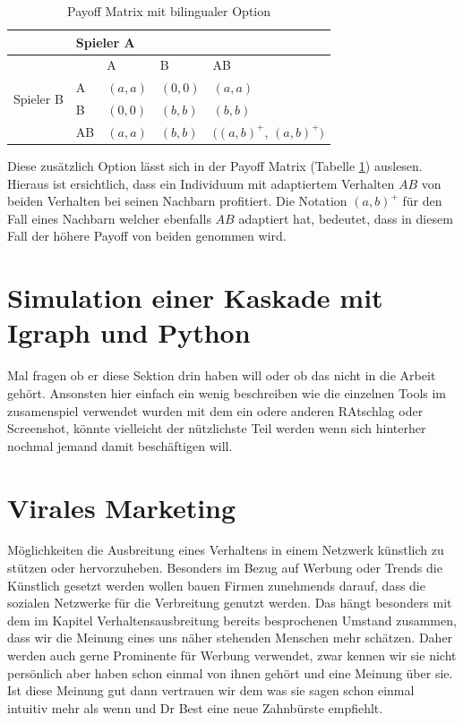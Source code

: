 \documentclass[12pt]{article}
\begin{document}
\begin{table}[h]
\centering
\caption{Payoff Matrix mit bilingualer Option}
\label{table_payoffBi}
\begin{tabular}{|l|l|l|l|l|}
\hline
                           & \multicolumn{4}{l|}{Spieler A}                                          \\ \hline
\multirow{4}{*}{Spieler B} &    & A     & B     & AB                                                 \\ \cline{2-5} 
                           & A  & $(a,a)$ & $(0,0)$ & $(a,a)$                                              \\ \cline{2-5} 
                           & B  & $(0,0)$ & $(b,b)$ & $(b,b)$                                              \\ \cline{2-5} 
                           & AB & $(a,a)$ & $(b,b)$ & $((a,b)^+$, $(a,b)^+)$ \\ \hline
\end{tabular}
\end{table}

Diese zusätzlich Option lässt sich in der Payoff Matrix (Tabelle \ref{table_payoffBi}) auslesen. Hieraus ist ersichtlich, dass ein Individuum mit adaptiertem Verhalten $AB$ von beiden Verhalten bei seinen Nachbarn profitiert. Die Notation $(a,b)^+$ für den Fall eines Nachbarn welcher ebenfalls $AB$ adaptiert hat, bedeutet, dass in diesem Fall der höhere Payoff von beiden genommen wird.


\section{Simulation einer Kaskade mit Igraph und Python}
Mal fragen ob er diese Sektion drin haben will oder ob das nicht in die Arbeit gehört. Ansonsten hier einfach ein wenig beschreiben wie die einzelnen Tools im zusamenspiel verwendet wurden mit dem ein odere anderen RAtschlag oder Screenshot, könnte vielleicht der nützlichste Teil werden wenn sich hinterher nochmal jemand damit beschäftigen will.

\section{Virales Marketing}
Möglichkeiten die Ausbreitung eines Verhaltens in einem Netzwerk künstlich zu stützen oder hervorzuheben. Besonders im Bezug auf Werbung oder Trends die Künstlich gesetzt werden wollen bauen Firmen zunehmends darauf, dass die sozialen Netzwerke für die Verbreitung genutzt werden. Das hängt besonders mit dem im Kapitel Verhaltensausbreitung bereits besprochenen Umstand zusammen, dass wir die Meinung eines uns näher stehenden Menschen mehr schätzen. Daher werden auch gerne Prominente für Werbung verwendet, zwar kennen wir sie nicht persönlich aber haben schon einmal von ihnen gehört und eine Meinung über sie. Ist diese Meinung gut dann vertrauen wir dem was sie sagen schon einmal intuitiv mehr als wenn und Dr Best eine neue Zahnbürste empfiehlt.
\end{document}
